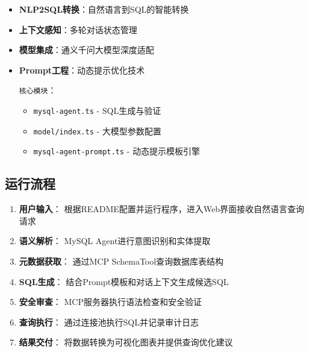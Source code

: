 \documentclass{article}
\begin{document}
	\begin{tcolorbox}[
		title=关键能力,
		colback=white,
		colframe=blue!50,
		fonttitle=\bfseries,
		coltitle=black,
		breakable
		]
		\begin{itemize}
			\item[\textcolor{filecolor}{\textbullet}] \textbf{NLP2SQL转换}：自然语言到SQL的智能转换
			\item[\textcolor{filecolor}{\textbullet}] \textbf{上下文感知}：多轮对话状态管理
			\item[\textcolor{filecolor}{\textbullet}] \textbf{模型集成}：通义千问大模型深度适配
			\item[\textcolor{filecolor}{\textbullet}] \textbf{Prompt工程}：动态提示优化技术
			
			\medskip
			\textcolor{funccolor}{\texttt{核心模块}}：
			\begin{itemize}
				\item \texttt{mysql-agent.ts} - SQL生成与验证
				\item \texttt{model/index.ts} - 大模型参数配置
				\item \texttt{mysql-agent-prompt.ts} - 动态提示模板引擎
			\end{itemize}
		\end{itemize}
	\end{tcolorbox}
	
	\subsection{运行流程}
	
	\begin{enumerate}[leftmargin=*,label=\textcolor{stepcolor}{\bfseries 步骤 \arabic*.}]
		\item \textbf{用户输入}：
		\textcolor{notecolor}{根据README配置并运行程序，进入Web界面接收自然语言查询请求}
		
		\item \textbf{语义解析}：
		\textcolor{notecolor}{MySQL Agent进行意图识别和实体提取}
		
		\item \textbf{元数据获取}：
		\textcolor{notecolor}{通过MCP SchemaTool查询数据库表结构}
		
		\item \textbf{SQL生成}：
		\textcolor{notecolor}{结合Prompt模板和对话上下文生成候选SQL}
		
		\item \textbf{安全审查}：
		\textcolor{notecolor}{MCP服务器执行语法检查和安全验证}
		
		\item \textbf{查询执行}：
		\textcolor{notecolor}{通过连接池执行SQL并记录审计日志}
		
		\item \textbf{结果交付}：
		\textcolor{notecolor}{将数据转换为可视化图表并提供查询优化建议}
	\end{enumerate}
	
\end{document}
